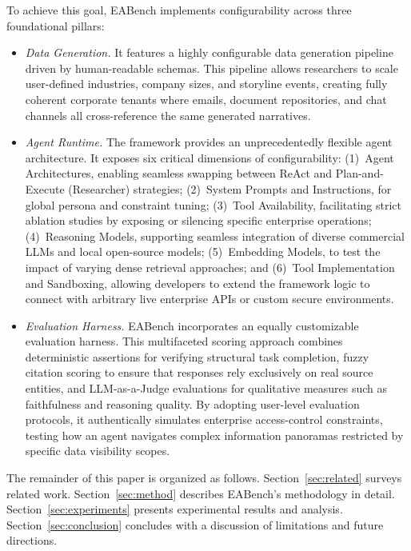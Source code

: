 \documentclass[journal,dvipsnames]{acmart}
\begin{document}
To achieve this goal, EABench implements configurability across three foundational pillars:
\begin{itemize}[leftmargin=*]
  \item \emph{Data Generation.} It features a highly configurable data generation pipeline driven by human-readable schemas. This pipeline allows researchers to scale user-defined industries, company sizes, and storyline events, creating fully coherent corporate tenants where emails, document repositories, and chat channels all cross-reference the same generated narratives.
  
  \item \emph{Agent Runtime.} The framework provides an unprecedentedly flexible agent architecture. It exposes six critical dimensions of configurability: (1)~Agent Architectures, enabling seamless swapping between ReAct and Plan-and-Execute (Researcher) strategies; (2)~System Prompts and Instructions, for global persona and constraint tuning; (3)~Tool Availability, facilitating strict ablation studies by exposing or silencing specific enterprise operations; (4)~Reasoning Models, supporting seamless integration of diverse commercial LLMs and local open-source models; (5)~Embedding Models, to test the impact of varying dense retrieval approaches; and (6)~Tool Implementation and Sandboxing, allowing developers to extend the framework logic to connect with arbitrary live enterprise APIs or custom secure environments.
  
  \item \emph{Evaluation Harness.} EABench incorporates an equally customizable evaluation harness. This multifaceted scoring approach combines deterministic assertions for verifying structural task completion, fuzzy citation scoring to ensure that responses rely exclusively on real source entities, and LLM-as-a-Judge evaluations for qualitative measures such as faithfulness and reasoning quality. By adopting user-level evaluation protocols, it authentically simulates enterprise access-control constraints, testing how an agent navigates complex information panoramas restricted by specific data visibility scopes.
\end{itemize}

The remainder of this paper is organized as follows.
Section~\ref{sec:related} surveys related work.
Section~\ref{sec:method} describes EABench's methodology in detail.
Section~\ref{sec:experiments} presents experimental results and analysis.
Section~\ref{sec:conclusion} concludes with a discussion of limitations and
future directions.
\end{document}
